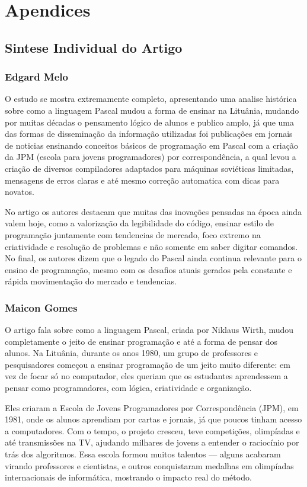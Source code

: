 \documentclass[12pt,a4paper,oneside]{abntex2}
\begin{document}
\appendix
\chapter{Apendices}
\section{Sintese Individual do Artigo}
\subsection{Edgard Melo}
O estudo se mostra extremamente completo, apresentando uma analise histórica sobre como a linguagem Pascal mudou a forma de ensinar na Lituânia, mudando por muitas décadas o pensamento lógico de alunos e publico amplo, já que uma das formas de disseminação da informação utilizadas foi publicações em jornais de noticias ensinando conceitos básicos de programação em Pascal com a criação da JPM (escola para jovens programadores) por correspondência, a qual levou a criação de diversos compiladores adaptados para máquinas soviéticas limitadas, mensagens de erros claras e até mesmo correção automatica com dicas para novatos.

No artigo os autores destacam que muitas das inovações pensadas na época ainda valem hoje, como a valorização da legibilidade do código, ensinar estilo de programação juntamente com tendencias de mercado, foco extremo na criatividade e resolução de problemas e não somente em saber digitar comandos. No final, os autores dizem que o legado do Pascal ainda continua relevante para o ensino de programação, mesmo com os desafios atuais gerados pela constante e rápida movimentação do mercado e tendencias.

\subsection{Maicon Gomes}
O artigo fala sobre como a linguagem Pascal, criada por Niklaus Wirth, mudou completamente o jeito de ensinar programação e até a forma de pensar dos alunos.
Na Lituânia, durante os anos 1980, um grupo de professores e pesquisadores começou a ensinar programação de um jeito muito diferente: em vez de focar só no computador, eles queriam que os estudantes aprendessem a pensar como programadores, com lógica, criatividade e organização.

Eles criaram a Escola de Jovens Programadores por Correspondência (JPM), em 1981, onde os alunos aprendiam por cartas e jornais, já que poucos tinham acesso a computadores.
Com o tempo, o projeto cresceu, teve competições, olimpíadas e até transmissões na TV, ajudando milhares de jovens a entender o raciocínio por trás dos algoritmos.
Essa escola formou muitos talentos — alguns acabaram virando professores e cientistas, e outros conquistaram medalhas em olimpíadas internacionais de informática, mostrando o impacto real do método.
\end{document}
